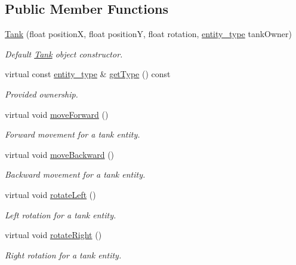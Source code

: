 \subsection*{Public Member Functions}
\begin{DoxyCompactItemize}
\item 
\hyperlink{classTank_a6150bd84a309e15815122a050972ada3}{Tank} (float position\-X, float position\-Y, float rotation, \hyperlink{Structures_8h_a6d8f83e710b27d4f86c45f0bb77066e3}{entity\-\_\-type} tank\-Owner)
\begin{DoxyCompactList}\small\item\em Default \hyperlink{classTank}{Tank} object constructor. \end{DoxyCompactList}\item 
virtual const \hyperlink{Structures_8h_a6d8f83e710b27d4f86c45f0bb77066e3}{entity\-\_\-type} \& \hyperlink{classTank_a13af6c47c61682ebd1463fd9ef34439b}{get\-Type} () const 
\begin{DoxyCompactList}\small\item\em Provided ownership. \end{DoxyCompactList}\item 
virtual void \hyperlink{classTank_a7d4317a50c215c97679cf9d2fb40e223}{move\-Forward} ()
\begin{DoxyCompactList}\small\item\em Forward movement for a tank entity. \end{DoxyCompactList}\item 
virtual void \hyperlink{classTank_a6fa5abbf02267f1e30e485b043abc1c2}{move\-Backward} ()
\begin{DoxyCompactList}\small\item\em Backward movement for a tank entity. \end{DoxyCompactList}\item 
virtual void \hyperlink{classTank_aed009351545e9019140e75bd8365e1ad}{rotate\-Left} ()
\begin{DoxyCompactList}\small\item\em Left rotation for a tank entity. \end{DoxyCompactList}\item 
virtual void \hyperlink{classTank_a61c8d236aa98a258276654d02820966f}{rotate\-Right} ()
\begin{DoxyCompactList}\small\item\em Right rotation for a tank entity. \end{DoxyCompactList}\item 

\end{DoxyCompactItemize}

